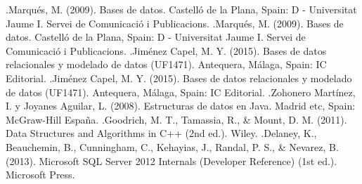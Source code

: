 \documentclass[twoside,twocolumn]{article}
\begin{document}
\begin{thebibliography}{99} %

\bibitem
[1].Marqués, M. (2009). Bases de datos. Castelló de la Plana, Spain: D - Universitat Jaume I. Servei de Comunicació i Publicacions. 
\bibitem
[2].Marqués, M. (2009). Bases de datos. Castelló de la Plana, Spain: D - Universitat Jaume I. Servei de Comunicació i Publicacions.  
\bibitem
[3].Jiménez Capel, M. Y. (2015). Bases de datos relacionales y modelado de datos (UF1471). Antequera, Málaga, Spain: IC Editorial. 
\bibitem
[4].Jiménez Capel, M. Y. (2015). Bases de datos relacionales y modelado de datos (UF1471). Antequera, Málaga, Spain: IC Editorial. 
\bibitem
[5].Zohonero Martínez, I. y Joyanes Aguilar, L. (2008). Estructuras de datos en Java. Madrid etc, Spain: McGraw-Hill España.
\bibitem
[6].Goodrich, M. T., Tamassia, R., \& Mount, D. M. (2011). Data Structures and Algorithms in C++ (2nd ed.). Wiley.
\bibitem
[7].Delaney, K., Beauchemin, B., Cunningham, C., Kehayias, J., Randal, P. S., \& Nevarez, B. (2013). Microsoft SQL Server 2012 Internals (Developer Reference) (1st ed.). Microsoft Press.
\end{thebibliography}

\end{document}
